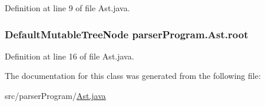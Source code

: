 Definition at line 9 of file Ast.\-java.

\hypertarget{classparser_program_1_1_ast_a004223ce41eed0c97a6fb63449b4b836}{
\subsubsection[{root}]{\setlength{\rightskip}{0pt plus 5cm}Default\-Mutable\-Tree\-Node {\bf parser\-Program.\-Ast.\-root}}}\label{classparser_program_1_1_ast_a004223ce41eed0c97a6fb63449b4b836}


Definition at line 16 of file Ast.\-java.



The documentation for this class was generated from the following file\-:\begin{DoxyCompactItemize}
\item 
src/parser\-Program/\hyperlink{_ast_8java}{Ast.\-java}\end{DoxyCompactItemize}
